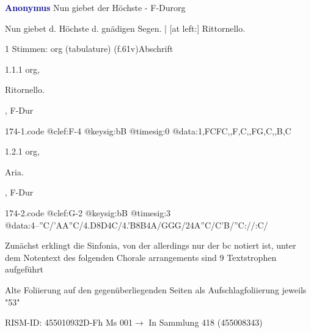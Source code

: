 \documentclass[twocolumn, 12pt]{book}
\begin{document}
\par \vspace{16pt} \textcolor{darkblue}{\textbf{Anonymus  }}\hfillplus{\textbf{[174]}}\newline Nun giebet der Höchste - F-Dur\newline org
\par \begin{itshape}[heading, f.61v:] Nun giebet d. Höchste d. gnädigen Segen. | [at left:] Rittornello.\end{itshape} 
\par \textcolor{darkblue}{}  1 Stimmen: org (tabulature)  (f.61v)\newline Abschrift
\par 1.1.1  org, \begin{itshape}Ritornello.\end{itshape}, F-Dur  
\begin{filecontents*}{174-1.code}
@clef:F-4
@keysig:bB
@timesig:0
@data:1,FCFC,,F,C,,FG,C,,B,C
\end{filecontents*}
\newline %
\par 1.2.1  org, \begin{itshape}Aria.\end{itshape}, F-Dur  
\begin{filecontents*}{174-2.code}
@clef:G-2
@keysig:bB
@timesig:3
@data:4--''C/'AA''C/4.D8D4C/4.'B8B4A/GGG/24A''C/C'B/''C://:C/
\end{filecontents*}
\newline %
\par Zunächst erklingt die Sinfonia, von der allerdings nur der bc notiert ist, unter dem Notentext des folgenden Chorale arrangements sind 9 Textstrophen aufgeführt
\par Alte Foliierung auf den gegenüberliegenden Seiten als Aufschlagfoliierung jeweils "53"
\par RISM-ID: 455010932\newline D-Fh  Ms 001\newline $\rightarrow$ In Sammlung 418 (455008343)
      
\end{document}
